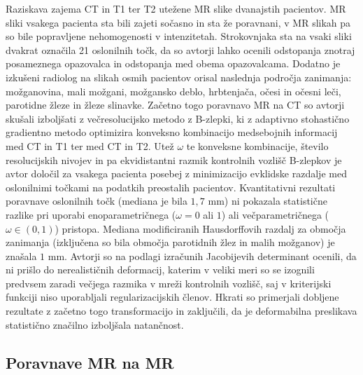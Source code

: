 \documentclass[journal]{IEEEtran}
\begin{document}
Raziskava \cite{fortunati2014} zajema CT in T1 ter T2 utežene MR slike dvanajstih pacientov. MR sliki vsakega pacienta sta bili zajeti sočasno in sta že poravnani, v MR slikah pa so bile popravljene nehomogenosti v intenzitetah. Strokovnjaka sta na vsaki sliki dvakrat označila 21 oslonilnih točk, da so avtorji lahko ocenili odstopanja znotraj posameznega opazovalca in odstopanja med obema opazovalcama. Dodatno je izkušeni radiolog na slikah osmih pacientov orisal naslednja področja zanimanja: možganovina, mali možgani, možgansko deblo, hrbtenjača, očesi in očesni leči, parotidne žleze in žleze slinavke. Začetno togo poravnavo MR na CT so avtorji skušali izboljšati z večresolucijsko metodo z B-zlepki, ki z adaptivno stohastično gradientno metodo optimizira konveksno kombinacijo medsebojnih informacij med CT in T1 ter med CT in T2. Utež $\omega$ te konveksne kombinacije, število resolucijskih nivojev in pa ekvidistantni razmik kontrolnih vozlišč B-zlepkov je avtor določil za vsakega pacienta posebej z minimizacijo evklidske razdalje med oslonilnimi točkami na podatkih preostalih pacientov. Kvantitativni rezultati poravnave oslonilnih točk (mediana je bila $1{,}7$ mm) ni pokazala statistične razlike pri uporabi enoparametričnega ($\omega = 0$ ali $1$) ali večparametričnega ($\omega\in(0,1)$) pristopa. Mediana modificiranih Hausdorffovih razdalj za območja zanimanja (izključena so bila območja parotidnih žlez in malih možganov) je znašala $1$ mm. Avtorji so na podlagi izračunih Jacobijevih determinant ocenili, da ni prišlo do nerealističnih deformacij, katerim v veliki meri so se izognili predvsem zaradi večjega razmika v mreži kontrolnih vozlišč, saj v kriterijski funkciji niso uporabljali regularizacijskih členov. Hkrati so primerjali dobljene rezultate z začetno togo transformacijo in zaključili, da je deformabilna preslikava statistično značilno izboljšala natančnost.

\subsection{Poravnave MR na MR}
\end{document}
